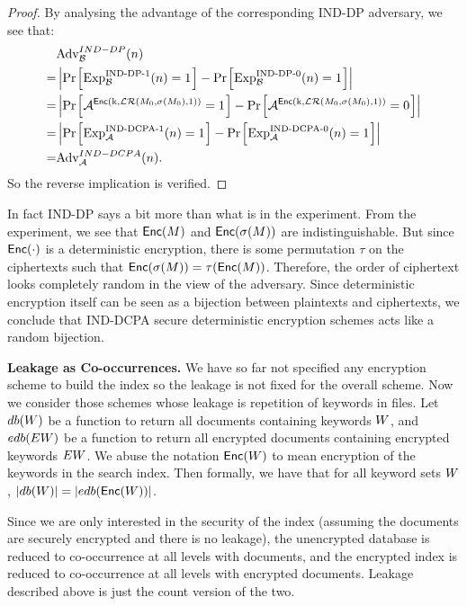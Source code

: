\begin{proof}
By analysing the advantage of the corresponding IND-DP adversary, we see that:
\begin{align*}
& \advantage_{\mathcal{B}}^{IND-DP}(n) \\
= &\left| \prob{\text{Exp}_{\mathcal{B}}^{\text{IND-DP-1}}(n) = 1} - \prob{\text{Exp}_{\mathcal{B}}^{\text{IND-DP-0}}(n) = 1} \right| \\
= & \left| \prob{\adv^{\enc(\key, \mathcal{LR}(M_0, \sigma(M_0), 1))} = 1} - \prob{\adv^{\enc(\key, \mathcal{LR}(M_0, \sigma(M_0), 1))} = 0} \right| \\
= & \left| \prob{\text{Exp}_{\adv}^{\text{IND-DCPA-1}}(n) = 1} - \prob{\text{Exp}_{\adv}^{\text{IND-DCPA-0}}(n) = 1} \right| \\
= & \advantage_{\adv}^{IND-DCPA}(n).
\end{align*}
So the reverse implication is verified.
\end{proof}

In fact IND-DP says a bit more than what is in the experiment. From the experiment, we see that $\mathsf{Enc}(M)$ and $\mathsf{Enc}(\sigma(M))$ are indistinguishable. But since $\mathsf{Enc}(\cdot)$ is a deterministic encryption, there is some permutation $\tau$ on the ciphertexts such that $\mathsf{Enc}(\sigma(M)) = \tau(\mathsf{Enc}(M))$. Therefore, the order of ciphertext looks completely random in the view of the adversary. Since deterministic encryption itself can be seen as a bijection between plaintexts and ciphertexts, we conclude that IND-DCPA secure deterministic encryption schemes acts like a random bijection.




\textbf{Leakage as Co-occurrences.} We have so far not specified any encryption scheme to build the index so the leakage is not fixed for the overall scheme. Now we consider those schemes whose leakage is repetition of keywords in files. Let $db(W)$ be a function to return all documents containing keywords $W$, and $edb(EW)$ be a function to return all encrypted documents containing encrypted keywords $EW$. We abuse the notation $\mathsf{Enc}(W)$ to mean encryption of the keywords in the search index. Then formally, we have that for all keyword sets $W$, $|db(W)| = |edb(\mathsf{Enc}(W))|$.

Since we are only interested in the security of the index (assuming the documents are securely encrypted and there is no leakage), the unencrypted database is reduced to co-occurrence at all levels with documents, and the encrypted index is reduced to co-occurrence at all levels with encrypted documents. Leakage described above is just the count version of the two.




